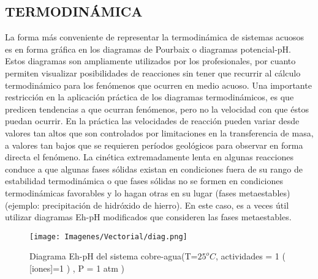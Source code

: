 \subsection{TERMODIN\'AMICA}
La forma m\'as conveniente de representar la termodin\'amica de sistemas acuosos es en forma gr\'afica en los diagramas de Pourbaix o diagramas potencial-pH. Estos diagramas son ampliamente utilizados por los profesionales, por cuanto permiten visualizar posibilidades de reacciones sin tener que recurrir al c\'alculo termodin\'amico para los fen\'omenos que ocurren en medio acuoso.
Una importante restricci\'on en la aplicaci\'on pr\'actica de los diagramas termodin\'amicos, es que predicen tendencias a que ocurran fen\'omenos, pero no la velocidad con que \'estos puedan ocurrir. En la pr\'actica las velocidades de reacci\'on pueden variar desde valores tan altos que son controlados por limitaciones en la transferencia de masa, a valores tan bajos que se requieren per\'iodos geol\'ogicos para observar en forma directa el fen\'omeno. La cin\'etica extremadamente lenta en algunas reacciones conduce a que algunas fases s\'olidas existan en condiciones fuera de su rango de estabilidad termodin\'amica o que fases s\'olidas no se formen en condiciones termodin\'amicas favorables y lo hagan otras en su lugar (fases metaestables) (ejemplo: precipitaci\'on de hidr\'oxido de hierro). En este caso, es a veces \'util utilizar diagramas Eh-pH modificados que consideren las fases metaestables.

\begin{figure}[H]
 \centering
 \texttt{[image: Imagenes/Vectorial/diag.png]}
 \caption{Diagrama Eh-pH del sistema cobre-agua(T=$25^oC$, actividades = 1 ( [iones]=1 ) , P = 1 atm )}
 \label{fig:f}
\end{figure}

